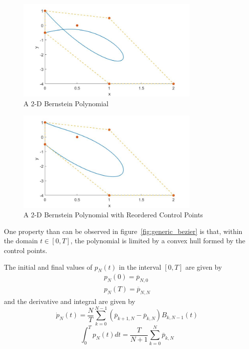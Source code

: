 \begin{figure}[h!]
\centering
\includegraphics[width=0.8\textwidth]{Images/generic_bezier2D.jpg}
\caption{A 2-D Bernstein Polynomial}
\label{fig:generic_bezier2D}
\end{figure}

\begin{figure}[h!]
\centering
\includegraphics[width=0.8\textwidth]{Images/generic_bezier2D_reordered.jpg}
\caption{A 2-D Bernstein Polynomial with Reordered Control Points}
\label{fig:generic_bezier2D_reordered}
\end{figure}


\par One property than can be observed in figure~\ref{fig:generic_bezier} is that, within the domain $t \in [0,T]$, the polynomial is limited by a convex hull \cite{cichella2018bernstein} formed by the control points.
\par The initial and final values of $p_N(t)$ in the interval $[0,T]$ are given by
\begin{equation}
    \label{eq:bern_in_fin}
    \begin{gathered}
        p_N(0) = \overline{p}_{N,0} \\
        p_N(T) = \overline{p}_{N,N}
    \end{gathered}
\end{equation}
and the derivative and integral are given by 
\begin{equation}
    \label{eq:bern_deriv}
    \dot{p}_N(t) = \frac{N}{T} \sum_{k=0}^{N-1} (\overline{p}_{k+1,N} - \overline{p}_{k,N}) B_{k,N-1}(t)
\end{equation}
\begin{equation}
    \label{eq:bern_int}
    \int_0^T p_N(t)dt = \frac{T}{N+1} \sum_{k=0}^{N} \overline{p}_{k,N}
\end{equation}

